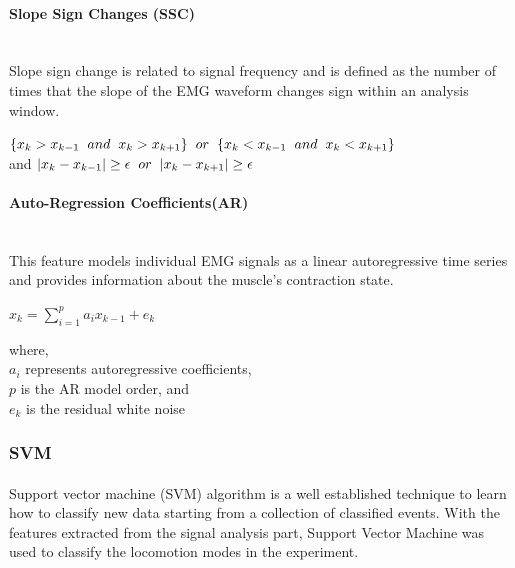 \documentclass[12pt]{article}
\begin{document}
\paragraph{Slope Sign Changes (SSC)}\cite{Dennis Tkach}\\
Slope sign change is related to signal frequency and is defined as the number of times that the slope of the EMG waveform changes sign within an analysis window. 
\begin{center}
$\{x_k > x_{k-1} \hspace{0.2cm} and \hspace{0.2cm} x_k > x_{k+1}\}\hspace{0.2cm} or \hspace{0.2cm}\{x_k < x_{k-1} \hspace{0.2cm} and \hspace{0.2cm} x_k < x_{k+1}\}$ \\
and $|x_k - x_{k-1}| \geq \epsilon \hspace{0.2cm} or \hspace{0.2cm} |x_k - x_{k+1}| \geq \epsilon$
\end{center}

\paragraph{Auto-Regression Coefficients(AR)}\cite{Dennis Tkach}\\
This feature models individual EMG signals as a linear autoregressive time series and provides information about the muscle's contraction state.\\
\begin{center}
$x_k = \sum_{i=1}^{p}a_i x_{k-1} + e_k$\\
\end{center}
where,\\ 
$a_i$ represents autoregressive coefficients, \\
$p$ is the AR model order, and \\
$e_k$ is the residual white noise\\

\subsubsection{SVM}
\paragraph{}
Support vector machine (SVM) algorithm is a well established technique to learn how to classify new data starting from a collection of classified events. With the features extracted from the signal analysis part, Support Vector Machine was used to classify the locomotion modes in the experiment. 
\end{document}
